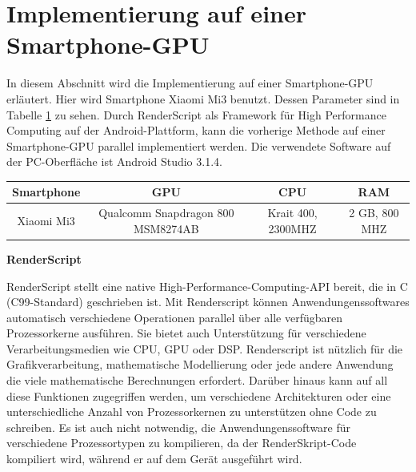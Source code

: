 

\section{Implementierung auf einer Smartphone-GPU}

In diesem Abschnitt wird die Implementierung auf einer Smartphone-GPU erläutert. Hier wird Smartphone Xiaomi Mi3 benutzt. Dessen Parameter sind in Tabelle \ref{tbl:Grundlegende Parameter für Mi3} zu sehen. Durch RenderScript als Framework für High Performance Computing auf der Android-Plattform, kann die vorherige Methode auf einer Smartphone-GPU parallel implementiert werden. Die verwendete Software auf der PC-Oberfläche ist Android Studio 3.1.4.

\begin{table}[htb]
	\label{tbl:Grundlegende Parameter für Mi3}
	\footnotesize
	\centering
	\begin{tabular}{|c|c|c|c|}
	\toprule
	\textbf{Smartphone} & \textbf{GPU} & \textbf{CPU} & \textbf{RAM}\\
	\midrule
	Xiaomi Mi3  & Qualcomm Snapdragon 800 MSM8274AB & Krait 400, 2300MHZ & 2 GB, 800 MHZ \\
	\bottomrule
	\end{tabular}
\end{table} 

\textbf{RenderScript}

RenderScript stellt eine native High-Performance-Computing-API bereit, die in C (C99-Standard) geschrieben ist. Mit Renderscript können Anwendungenssoftwares automatisch verschiedene Operationen parallel über alle verfügbaren Prozessorkerne ausführen. Sie bietet auch Unterstützung für verschiedene Verarbeitungsmedien wie CPU, GPU oder DSP. Renderscript ist nützlich für die Grafikverarbeitung, mathematische Modellierung oder jede andere Anwendung die viele mathematische Berechnungen erfordert. Darüber hinaus kann auf all diese Funktionen zugegriffen werden, um verschiedene Architekturen oder eine unterschiedliche Anzahl von Prozessorkernen zu unterstützen ohne Code zu schreiben. Es ist auch nicht notwendig, die Anwendungenssoftware für verschiedene Prozessortypen zu kompilieren, da der RenderSkript-Code kompiliert wird, während er auf dem Gerät ausgeführt wird.

